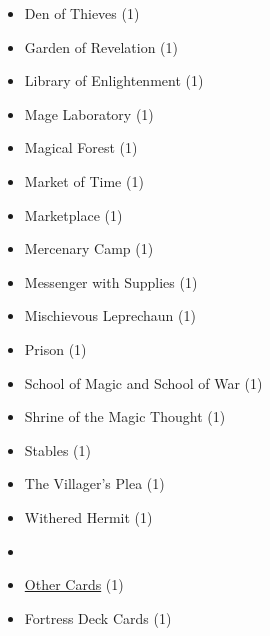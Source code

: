 \begin{multicols}{3}
\begin{itemize}[leftmargin=0pt, label={}, noitemsep, noitemsep]
  \item Den of Thieves (1)
  \item Garden of Revelation (1)
  \item Library of Enlightenment (1)
  \item Mage Laboratory (1)
  \item Magical Forest (1)
  \item Market of Time (1)
  \item Marketplace (1)
  \item Mercenary Camp (1)
  \item Messenger with Supplies (1)
  \item Mischievous Leprechaun (1)
  \item Prison (1)
  \item School of Magic and School of War (1)
  \item Shrine of the Magic Thought (1)
  \item Stables (1)
  \item The Villager's Plea (1)
  \item Withered Hermit (1)
  \item
  \item \underline{Other Cards} (1)
  \item Fortress Deck Cards (1)
\end{itemize}

\end{multicols}
